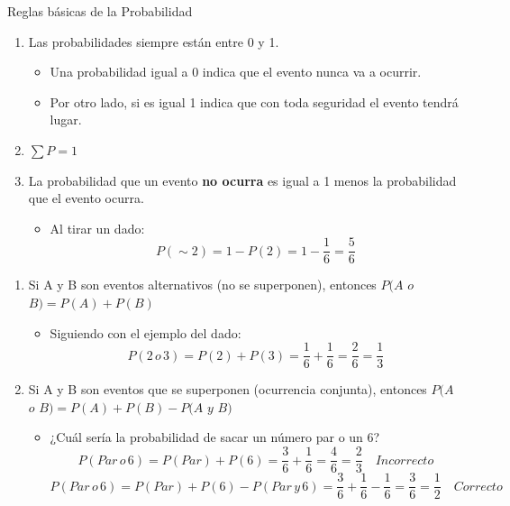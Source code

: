 \documentclass[xcolor=dvipsnames]{beamer}
\newcounter{saveenumi}
\newcommand{\seti}{\setcounter{saveenumi}{\value{enumi}}}
\newcommand{\conti}{\setcounter{enumi}{\value{saveenumi}}}
\begin{document}
\begin{frame}{Reglas básicas de la Probabilidad}
\begin{enumerate}
\justifying
\item Las probabilidades siempre están entre 0 y 1.
\begin{itemize}
	
\item Una probabilidad igual a 0 indica que el evento nunca va a ocurrir. 
\item Por otro lado, si es igual 1 indica que con toda seguridad el evento tendrá lugar.
\end{itemize}
\item $\sum{P}=1$
\item La probabilidad que un evento {\bf no ocurra} es igual a 1 menos la probabilidad que el evento ocurra.
\begin{itemize}
\item Al tirar un dado:
$$P(\sim2)=1-P(2)=1-\dfrac{1}{6}=\dfrac{5}{6}$$
\end{itemize}
 \seti
\end{enumerate}
\end{frame}
\begin{frame}
\begin{enumerate}
	\justifying
\conti
\item Si A y B son eventos alternativos (no se superponen), entonces $P(A$ $o$ $B)=P(A)+P(B)$
\begin{itemize}
\item Siguiendo con el ejemplo del dado:
$$P(2\, o\,  3)=P(2)+P(3)=\dfrac{1}{6}+\dfrac{1}{6}=\dfrac{2}{6}=\dfrac{1}{3}$$
\end{itemize}
\item Si A y B son eventos que se superponen (ocurrencia conjunta), entonces $P(A$ $o$ $B)=P(A)+P(B)-P(A$ $y$ $B)$
\begin{itemize}
\item ¿Cuál sería la probabilidad de sacar un número par o un 6?
$$P(Par\, o\,  6)=P(Par)+P(6)=\dfrac{3}{6}+\dfrac{1}{6}=\dfrac{4}{6}=\dfrac{2}{3} \quad Incorrecto $$
$$P(Par\, o\,  6)=P(Par)+P(6)-P(Par\, y\,  6)=\dfrac{3}{6}+\dfrac{1}{6}-\dfrac{1}{6}=\dfrac{3}{6}=\dfrac{1}{2} \quad Correcto $$
\end{itemize}
\seti
\end{enumerate}

\end{frame}
\end{document}
